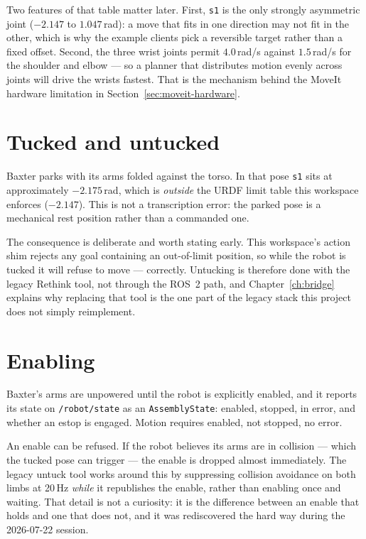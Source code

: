 Two features of that table matter later. First, \texttt{s1} is the only strongly
asymmetric joint ($-2.147$ to $1.047$\,rad): a move that fits in one direction may
not fit in the other, which is why the example clients pick a reversible target
rather than a fixed offset. Second, the three wrist joints permit
$4.0$\,rad/s against $1.5$\,rad/s for the shoulder and elbow --- so a planner that
distributes motion evenly across joints will drive the wrists fastest. That is
the mechanism behind the MoveIt hardware limitation in
Section~\ref{sec:moveit-hardware}.

\section{Tucked and untucked}

Baxter parks with its arms folded against the torso. In that pose \texttt{s1}
sits at approximately $-2.175$\,rad, which is \emph{outside} the URDF limit table
this workspace enforces ($-2.147$). This is not a transcription error: the parked
pose is a mechanical rest position rather than a commanded one.

The consequence is deliberate and worth stating early. This workspace's action
shim rejects any goal containing an out-of-limit position, so while the robot is
tucked it will refuse to move --- correctly. Untucking is therefore done with the
legacy Rethink tool, not through the ROS~2 path, and Chapter~\ref{ch:bridge}
explains why replacing that tool is the one part of the legacy stack this project
does not simply reimplement.

\section{Enabling}

Baxter's arms are unpowered until the robot is explicitly enabled, and it reports
its state on \texttt{/robot/state} as an \texttt{AssemblyState}: enabled, stopped,
in error, and whether an estop is engaged. Motion requires enabled, not stopped,
no error.

An enable can be refused. If the robot believes its arms are in collision --- which
the tucked pose can trigger --- the enable is dropped almost immediately.
The legacy untuck tool works around this by suppressing collision avoidance on
both limbs at 20\,Hz \emph{while} it republishes the enable, rather than enabling
once and waiting. That detail is not a curiosity: it is the difference between an
enable that holds and one that does not, and it was rediscovered the hard way
during the 2026-07-22 session.

